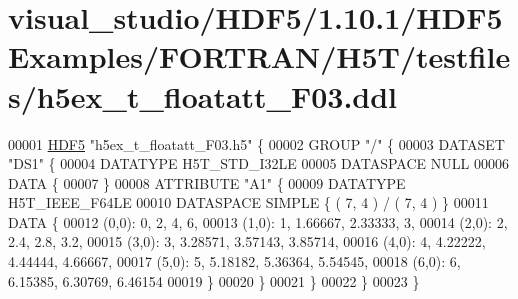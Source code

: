 \hypertarget{visual__studio_2_h_d_f5_21_810_81_2_h_d_f5_examples_2_f_o_r_t_r_a_n_2_h5_t_2testfiles_2h5ex__t__floatatt___f03_8ddl_source}{}\section{visual\+\_\+studio/\+H\+D\+F5/1.10.1/\+H\+D\+F5\+Examples/\+F\+O\+R\+T\+R\+A\+N/\+H5\+T/testfiles/h5ex\+\_\+t\+\_\+floatatt\+\_\+\+F03.ddl}
\label{visual__studio_2_h_d_f5_21_810_81_2_h_d_f5_examples_2_f_o_r_t_r_a_n_2_h5_t_2testfiles_2h5ex__t__floatatt___f03_8ddl_source}

\begin{DoxyCode}
00001 \hyperlink{namespace_h_d_f5}{HDF5} \textcolor{stringliteral}{"h5ex\_t\_floatatt\_F03.h5"} \{
00002 GROUP \textcolor{stringliteral}{"/"} \{
00003    DATASET \textcolor{stringliteral}{"DS1"} \{
00004       DATATYPE  H5T\_STD\_I32LE
00005       DATASPACE  NULL
00006       DATA \{
00007       \}
00008       ATTRIBUTE \textcolor{stringliteral}{"A1"} \{
00009          DATATYPE  H5T\_IEEE\_F64LE
00010          DATASPACE  SIMPLE \{ ( 7, 4 ) / ( 7, 4 ) \}
00011          DATA \{
00012          (0,0): 0, 2, 4, 6,
00013          (1,0): 1, 1.66667, 2.33333, 3,
00014          (2,0): 2, 2.4, 2.8, 3.2,
00015          (3,0): 3, 3.28571, 3.57143, 3.85714,
00016          (4,0): 4, 4.22222, 4.44444, 4.66667,
00017          (5,0): 5, 5.18182, 5.36364, 5.54545,
00018          (6,0): 6, 6.15385, 6.30769, 6.46154
00019          \}
00020       \}
00021    \}
00022 \}
00023 \}
\end{DoxyCode}
